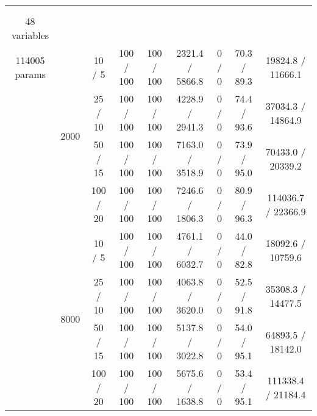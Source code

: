 \documentclass[twoside,11pt]{article}
\begin{document}
\begin{table}[ht]
\begin{tabular}{@{}c | c | c || c | c | c || c | c | c@{}}
\hhline{=|=|=||=|=|=|=|=|=}
\multirow{8}{*}{\thead{\textbf{barley} \\ \\ 48 variables \\ 114005 params}} & \multirow{4}{*}{2000} 
& 10 / 5 & 100 / 100 & 100 / 100 & 2321.4 / 5866.8 & \cellcolor{yellow!100} 0 / 0 & \cellcolor{yellow!100} 70.3 / 89.3 & 19824.8 / 11666.1  \\
& & 25 / 10 & 100 / 100  & 100 / 100 & 4228.9 / 2941.3 & \cellcolor{yellow!100} 0 / 0 & \cellcolor{yellow!100} 74.4 / 93.6  & 37034.3 / 14864.9 \\
& & 50 / 15 & 100 / 100 & 100 / 100  & 7163.0 / 3518.9 & \cellcolor{yellow!100} 0 / 0 & \cellcolor{yellow!100} 73.9 / 95.0 & 70433.0 / 20339.2  \\
& & 100 / 20 & 100 / 100 & 100 / 100 & 7246.6 / 1806.3 & \cellcolor{yellow!100} 0 / 0 & \cellcolor{yellow!100} 80.9 / 96.3 & 114036.7 / 22366.9 \\

\hhline {~|-|-||-|-|-||-|-|-}
& \multirow{4}{*}{8000}
& 10 / 5 & 100 / 100 & 100 / 100 & 4761.1 / 6032.7 & \cellcolor{yellow!100} 0 / 0 & \cellcolor{yellow!100} 44.0 / 82.8 & 18092.6 / 10759.6 \\
& & 25 / 10 & 100 / 100  & 100 / 100 & 4063.8 / 3620.0 & \cellcolor{yellow!100} 0 / 0 & \cellcolor{yellow!100} 52.5 / 91.8 & 35308.3 / 14477.5 \\
& & 50 / 15 & 100 / 100 & 100 / 100  & 5137.8 / 3022.8 & \cellcolor{yellow!100} 0 / 0 & \cellcolor{yellow!100} 54.0 / 95.1 & 64893.5 / 18142.0  \\
& & 100 / 20 & 100 / 100 & 100 / 100 & 5675.6 / 1638.8 & \cellcolor{yellow!100} 0 / 0 & \cellcolor{yellow!100} 53.4 / 95.1 & 111338.4 / 21184.4 \\
\end{tabular}
\end{table}
\end{document}
